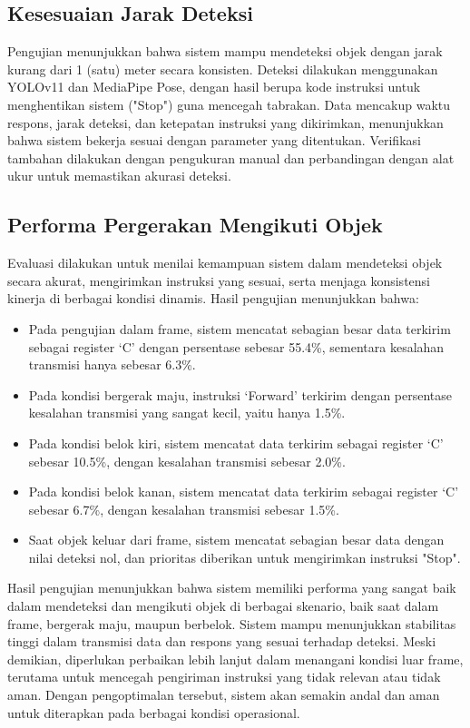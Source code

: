 \subsection{Kesesuaian Jarak Deteksi}
\label{sec:kesesuaianjarak}

Pengujian menunjukkan bahwa sistem mampu mendeteksi objek dengan jarak kurang dari 1 (satu) meter secara konsisten. Deteksi dilakukan menggunakan YOLOv11 dan MediaPipe Pose, dengan hasil berupa kode instruksi untuk menghentikan sistem ("Stop") guna mencegah tabrakan. Data mencakup waktu respons, jarak deteksi, dan ketepatan instruksi yang dikirimkan, menunjukkan bahwa sistem bekerja sesuai dengan parameter yang ditentukan. Verifikasi tambahan dilakukan dengan pengukuran manual dan perbandingan dengan alat ukur untuk memastikan akurasi deteksi.

\subsection{Performa Pergerakan Mengikuti Objek}
\label{sec:akurasiikutiobjek}

Evaluasi dilakukan untuk menilai kemampuan sistem dalam mendeteksi objek secara akurat, mengirimkan instruksi yang sesuai, serta menjaga konsistensi kinerja di berbagai kondisi dinamis. Hasil pengujian menunjukkan bahwa:

\begin{itemize}
    \item Pada pengujian dalam frame, sistem mencatat sebagian besar data terkirim sebagai register ‘C’ dengan persentase sebesar 55.4\%, sementara kesalahan transmisi hanya sebesar 6.3\%.
    \item Pada kondisi bergerak maju, instruksi ‘Forward’ terkirim dengan persentase kesalahan transmisi yang sangat kecil, yaitu hanya 1.5\%.
    \item Pada kondisi belok kiri, sistem mencatat data terkirim sebagai register ‘C’ sebesar 10.5\%, dengan kesalahan transmisi sebesar 2.0\%.
    \item Pada kondisi belok kanan, sistem mencatat data terkirim sebagai register ‘C’ sebesar 6.7\%, dengan kesalahan transmisi sebesar 1.5\%.
    \item Saat objek keluar dari frame, sistem mencatat sebagian besar data dengan nilai deteksi nol, dan prioritas diberikan untuk mengirimkan instruksi "Stop".
\end{itemize}

Hasil pengujian menunjukkan bahwa sistem memiliki performa yang sangat baik dalam mendeteksi dan mengikuti objek di berbagai skenario, baik saat dalam frame, bergerak maju, maupun berbelok. Sistem mampu menunjukkan stabilitas tinggi dalam transmisi data dan respons yang sesuai terhadap deteksi. Meski demikian, diperlukan perbaikan lebih lanjut dalam menangani kondisi luar frame, terutama untuk mencegah pengiriman instruksi yang tidak relevan atau tidak aman. Dengan pengoptimalan tersebut, sistem akan semakin andal dan aman untuk diterapkan pada berbagai kondisi operasional.

